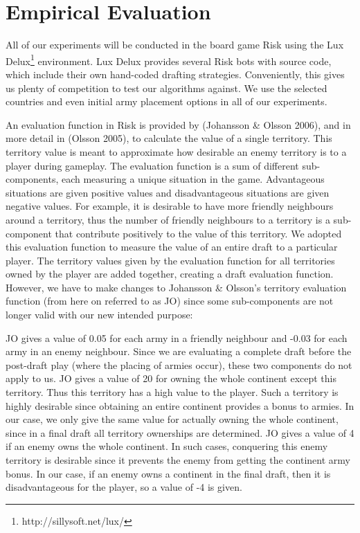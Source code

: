 \documentclass[letterpaper]{article}
\numberwithin{equation}{section}
\numberwithin{theorem}{section}
\numberwithin{lemma}{section}
\numberwithin{df}{section}
\begin{document}
\section{Empirical Evaluation}

All of our experiments will be conducted in the board game Risk using the Lux Delux\footnote{http://sillysoft.net/lux/} environment.  Lux Delux provides several Risk bots with source code, which include their own hand-coded drafting strategies.  Conveniently, this gives us plenty of competition to test our algorithms against.  We use the selected countries and even initial army placement options in all of our experiments.

An evaluation function in Risk is provided by (Johansson & Olsson 2006), and in more detail in (Olsson 2005), to calculate the value of a single territory.  This territory value is meant to approximate how desirable an enemy territory is to a player during gameplay.  The evaluation function is a sum of different sub-components, each measuring a unique situation in the game.  Advantageous situations are given positive values and disadvantageous situations are given negative values.  For example, it is desirable to have more friendly neighbours around a territory, thus the number of friendly neighbours to a territory is a sub-component that contribute positively to the value of this territory.
We adopted this evaluation function to measure the value of an entire draft to a particular player.  The territory values given by the evaluation function for all territories owned by the player are added together, creating a draft evaluation function.  However, we have to make changes to Johansson & Olsson’s territory evaluation function (from here on referred to as JO) since some sub-components are not longer valid with our new intended purpose:
\begin{itemize}
JO gives a value of 0.05 for each army in a friendly neighbour and -0.03 for each army in an enemy neighbour.  Since we are evaluating a complete draft before the post-draft play (where the placing of armies occur), these two components do not apply to us.
JO gives a value of 20 for owning the whole continent except this territory.  Thus this territory has a high value to the player.  Such a territory is highly desirable since obtaining an entire continent provides a bonus to armies.  In our case, we only give the same value for actually owning the whole continent, since in a final draft all territory ownerships are determined.
JO gives a value of 4 if an enemy owns the whole continent. In such cases, conquering this enemy territory is desirable since it prevents the enemy from getting the continent army bonus.  In our case, if an enemy owns a continent in the final draft, then it is disadvantageous for the player, so a value of -4 is given.
\end{itemize}	
	
\end{document}
